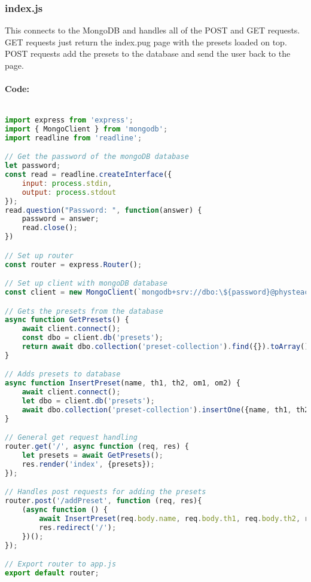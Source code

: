 \documentclass[12pt]{article}
\begin{document}
\subsubsection{index.js}
This connects to the MongoDB and handles all of the POST and GET requests. GET requests just return the index.pug page with the presets loaded on top. POST requests add the presets to the database and send the user back to the page.
\paragraph{Code:}
\begin{lstlisting}[language=JavaScript]

import express from 'express';
import { MongoClient } from 'mongodb';
import readline from 'readline';

// Get the password of the mongoDB database
let password;
const read = readline.createInterface({
    input: process.stdin,
    output: process.stdout
});
read.question("Password: ", function(answer) {
    password = answer;
    read.close();
})

// Set up router
const router = express.Router();

// Set up client with mongoDB database
const client = new MongoClient(`mongodb+srv://dbo:\${password}@physteach.dl3xqy3.mongodb.net/?retryWrites=true&w=majority`)

// Gets the presets from the database
async function GetPresets() {
    await client.connect();
    const dbo = client.db('presets');
    return await dbo.collection('preset-collection').find({}).toArray();
}

// Adds presets to database
async function InsertPreset(name, th1, th2, om1, om2) {
    await client.connect();
    let dbo = client.db('presets'); 
    await dbo.collection('preset-collection').insertOne({name, th1, th2, om1, om2});
}

// General get request handling
router.get('/', async function (req, res) {
    let presets = await GetPresets();
    res.render('index', {presets});
});

// Handles post requests for adding the presets
router.post('/addPreset', function (req, res){
    (async function () {
        await InsertPreset(req.body.name, req.body.th1, req.body.th2, req.body.om1, req.body.om2);
        res.redirect('/');
    })();
});

// Export router to app.js
export default router;

\end{lstlisting}
\end{document}
